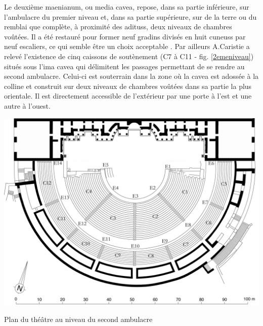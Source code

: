 		
		Le deuxième \gls{maenianum}, ou \gls{media cavea}, repose, dans sa partie inférieure, sur l'\gls{ambulacre} du premier niveau et, dans sa partie supérieure, sur de la terre ou du remblai que complète, à proximité des \glspl{aditus}, deux niveaux de chambres voûtées. Il a été restauré pour former neuf gradins divisés en huit \glspl{cuneus} par neuf escaliers, ce qui semble être un choix acceptable \cite[p. 340]{orangeTxt}. Par ailleurs A.Caristie a relevé l'existence de cinq caissons de soutènement (C7 à C11 - fig. \ref{2emeniveau}) situés sous l'\gls{ima cavea} qui délimitent les passages permettant de se rendre au second \gls{ambulacre}. Celui-ci est souterrain dans la zone où la \gls{cavea} est adossée à la colline et construit sur deux niveaux de chambres voûtées dans sa partie la plus orientale. Il est directement accessible de l'extérieur par une porte à l'est et une autre à l'ouest.
		
	\begin{figureth}
		\includegraphics[width=\linewidth]{images/2emeniveau}
		\caption[Vue de dessus - 2ème niveau]{Plan du théâtre au niveau du second \gls{ambulacre} \footnotemark }
		\label{2emeniveau}
	\end{figureth}		
		
